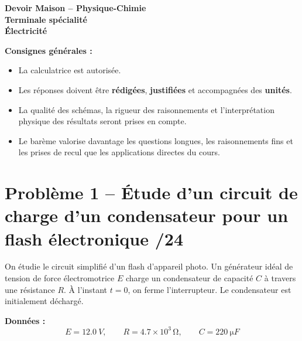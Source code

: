 \documentclass[11pt,a4paper]{article}
\begin{document}
\begin{center}
    {\LARGE \textbf{Devoir Maison -- Physique-Chimie}}\\[0.3em]
    {\Large \textbf{Terminale spécialité}}\\[0.5em]
    {\large \textbf{ Électricité}}\\[0.8em]
\end{center}

\vspace{0.5em}

\noindent\textbf{Consignes générales :}
\begin{itemize}
    \item La calculatrice est autorisée.
    \item Les réponses doivent être \textbf{rédigées}, \textbf{justifiées} et accompagnées des \textbf{unités}.
    \item La qualité des schémas, la rigueur des raisonnements et l'interprétation physique des résultats seront prises en compte.
    \item Le barème valorise davantage les questions longues, les raisonnements fins et les prises de recul que les applications directes du cours.
\end{itemize}

\vspace{0.8em}

\begin{center}
\end{center}

\section*{Problème 1 -- Étude d'un circuit de charge d'un condensateur pour un flash électronique \hfill /24}

On étudie le circuit simplifié d'un flash d'appareil photo. Un générateur idéal de tension de force électromotrice \(E\) charge un condensateur de capacité \(C\) à travers une résistance \(R\). À l'instant \(t=0\), on ferme l'interrupteur. Le condensateur est initialement déchargé.

\medskip

\noindent\textbf{Données :}
\[
E = \SI{12.0}{V}, \qquad R = 4.7\times 10^3\,\si{\ohm}, \qquad C = \SI{220}{\micro F}
\]
\end{document}
